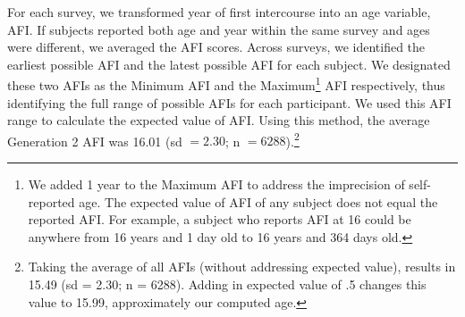 For each survey, we transformed year of first intercourse into an age variable, AFI. If subjects reported both age and year within the same survey and ages were different, we averaged the AFI scores. Across surveys, we identified the earliest possible AFI and the latest possible AFI for each subject. We designated these two AFIs as the Minimum AFI and the Maximum\footnote{We added 1 year to the Maximum AFI to address the imprecision of self-reported age. The expected value of AFI of any subject does not equal the reported AFI. For example, a subject who reports AFI at 16 could be anywhere from 16 years and 1 day old to 16 years and 364 days old.} AFI respectively, thus identifying the full range of possible AFIs for each participant. We used this AFI range to calculate the expected value of AFI. Using this method, the average Generation 2 AFI was 16.01 (sd $= 2.30$; n $= 6288$).\footnote{Taking the average of all AFIs (without addressing expected value), results in 15.49 (sd = 2.30; n = 6288). Adding in expected value of .5 changes this value to 15.99, approximately our computed age.}

